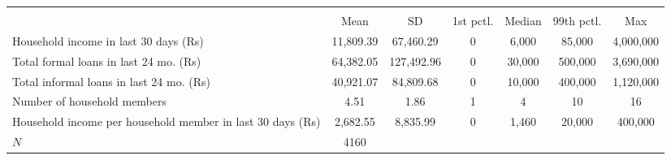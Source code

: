 {
\def\sym#1{\ifmmode^{#1}\else\(^{#1}\)\fi}
\begin{tabular}{l*{1}{cccccc}}
\toprule
            &\multicolumn{6}{c}{}                                                         \\
            &        Mean&          SD&   1st pctl.&      Median&  99th pctl.&         Max\\
\midrule
Household income in last 30 days (Rs)&   11,809.39&   67,460.29&           0&       6,000&      85,000&   4,000,000\\
Total formal loans in last 24 mo. (Rs)&   64,382.05&  127,492.96&           0&      30,000&     500,000&   3,690,000\\
Total informal loans in last 24 mo. (Rs)&   40,921.07&   84,809.68&           0&      10,000&     400,000&   1,120,000\\
Number of household members&        4.51&        1.86&           1&           4&          10&          16\\
Household income per household member in last 30 days (Rs)&    2,682.55&    8,835.99&           0&       1,460&      20,000&     400,000\\
\midrule
\(N\)       &        4160&            &            &            &            &            \\
\bottomrule
\end{tabular}
}
